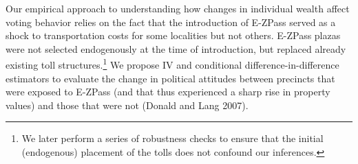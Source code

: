 Our empirical approach to understanding how changes in individual wealth affect voting behavior relies on the fact that the introduction of E-ZPass served as a shock to transportation costs for some localities but not others. E-ZPass plazas were not selected endogenously at the time of introduction, but replaced already existing toll structures.\footnote{We later perform a series of robustness checks to ensure that the initial (endogenous) placement of the tolls does not confound our inferences.} We propose IV and conditional difference-in-difference estimators to evaluate the change in political attitudes between precincts that were exposed to E-ZPass (and that thus experienced a sharp rise in property values) and those that were not (Donald and Lang 2007). 